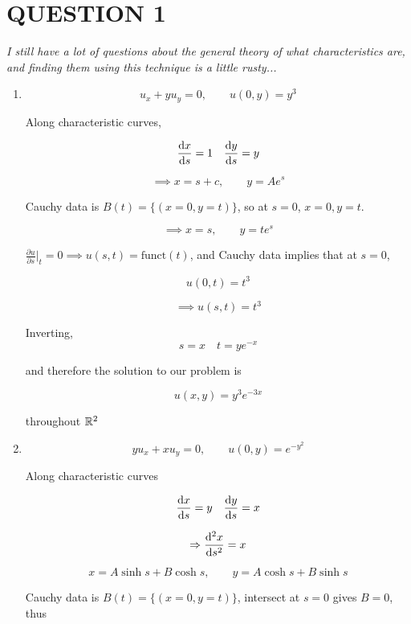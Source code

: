 \documentclass[a4paper]{article}
\begin{document}
	
\maketitle

\section{QUESTION 1}

\emph{I still have a lot of questions about the general theory of what characteristics are, and finding them using this technique is a little rusty...}

\begin{enumerate}
	\item 
	
	\[ u_{x} + y u_{y} = 0, \qquad u(0,y) = y^{3} \]
	
	
	Along characteristic curves,
	
	\[ \frac{\mathrm{d} x}{\mathrm{d} s} = 1 \quad \frac{\mathrm{d} y}{\mathrm{d} s} = y  \]
	
	\[ \implies  x = s + c, \qquad y = Ae^{s} \]
	

	
	Cauchy data is $ B(t) = \{ (x = 0, y = t) \} $, so at $ s = 0 $, $ x = 0, y = t $.
	
	\[ \implies x = s, \qquad y = t e^{s} \]
	
	$ \frac{\partial u}{\partial s} \big|_{t} = 0 \implies u(s,t) = \text{funct}(t) $, and Cauchy data implies that at $ s = 0 $, 
	
	\[ u(0,t) = t^{3} \]
	
	\[ \implies u(s,t) = t^{3} \]
	
	Inverting,
	\[ s = x \quad t = y e^{-x} \]
	
	and therefore the solution to our problem is 
	
	\[ u(x,y) = y^{3} e^{-3x} \]
	
	throughout $ \mathbb{R}^{2} $
	
	\item 
	
	\[ yu_{x} + x u_{y} = 0, \qquad u(0,y) = e^{-y^{2}} \]
	
	Along characteristic curves
	
	\[ \frac{\mathrm{d} x}{\mathrm{d} s} = y \quad \frac{\mathrm{d} y}{\mathrm{d} s} = x  \]
	
	\[ \Rightarrow \frac{\mathrm{d}^{2} x }{\mathrm{d} s^{2}} = x \]
	
	\[ x = A \sinh s + B \cosh s, \qquad y = A \cosh s + B \sinh s \]
	
	Cauchy data is $ B(t) = \{ (x = 0, y = t) \} $, intersect at $ s = 0 $ gives $ B = 0 $, thus
	

\end{enumerate}
\end{document}
